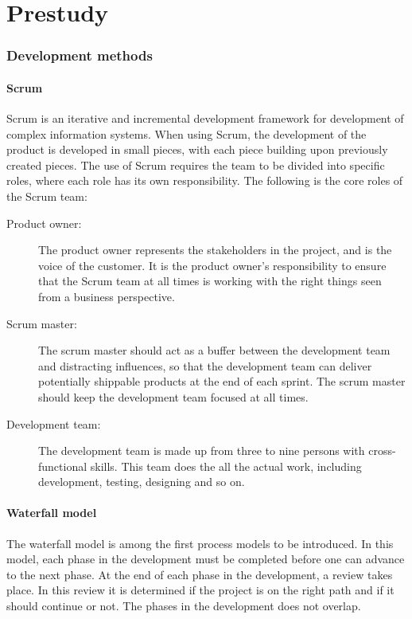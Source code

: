 \chapter{Prestudy}
\subsection{Development methods}
\subsubsection{Scrum}
Scrum is an iterative and incremental development framework for development of complex information systems. When using Scrum, the development of the product is developed in small pieces, with each piece building upon previously created pieces. The use of Scrum requires the team to be divided into specific roles, where each role has its own responsibility. The following is the core roles of the Scrum team:
\begin{description}
	\item[Product owner:]{The product owner represents the stakeholders in the project, and is the voice of the customer. It is the product owner's responsibility to ensure that the Scrum team at all times is working with the right things seen from a business perspective.}
	\item[Scrum master:]{The scrum master should act as a buffer between the development team and distracting influences, so that the development team can deliver potentially shippable products at the end of each sprint. The scrum master should keep the development team focused at all times.}
	\item[Development team:]{The development team is made up from three to nine persons with cross-functional skills. This team does the all the actual work, including development, testing, designing and so on.}
\end{description}

\subsubsection{Waterfall model}
The waterfall model is among the first process models to be introduced. In this model, each phase in the development must be completed before one can advance to the next phase. At the end of each phase in the development, a review takes place. In this review it is determined if the project is on the right path and if it should continue or not. The phases in the development does not overlap.


